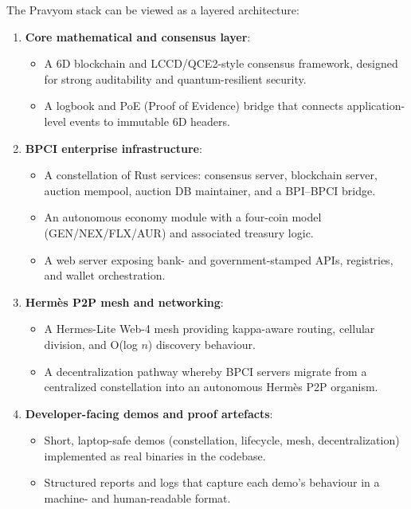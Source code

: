 The Pravyom stack can be viewed as a layered architecture:

\begin{enumerate}
  \item \textbf{Core mathematical and consensus layer}:
    \begin{itemize}
      \item A 6D blockchain and LCCD/QCE2-style consensus framework, designed for strong auditability and quantum-resilient security.
      \item A logbook and PoE (Proof of Evidence) bridge that connects application-level events to immutable 6D headers.
    \end{itemize}
  \item \textbf{BPCI enterprise infrastructure}:
    \begin{itemize}
      \item A constellation of Rust services: consensus server, blockchain server, auction mempool, auction DB maintainer, and a BPI--BPCI bridge.
      \item An autonomous economy module with a four-coin model (GEN/NEX/FLX/AUR) and associated treasury logic.
      \item A web server exposing bank- and government-stamped APIs, registries, and wallet orchestration.
    \end{itemize}
  \item \textbf{Herm\`es P2P mesh and networking}:
    \begin{itemize}
      \item A Hermes-Lite Web-4 mesh providing kappa-aware routing, cellular division, and O(log $n$) discovery behaviour.
      \item A decentralization pathway whereby BPCI servers migrate from a centralized constellation into an autonomous Herm\`es P2P organism.
    \end{itemize}
  \item \textbf{Developer-facing demos and proof artefacts}:
    \begin{itemize}
      \item Short, laptop-safe demos (constellation, lifecycle, mesh, decentralization) implemented as real binaries in the codebase.
      \item Structured reports and logs that capture each demo's behaviour in a machine- and human-readable format.
    \end{itemize}
\end{enumerate}

